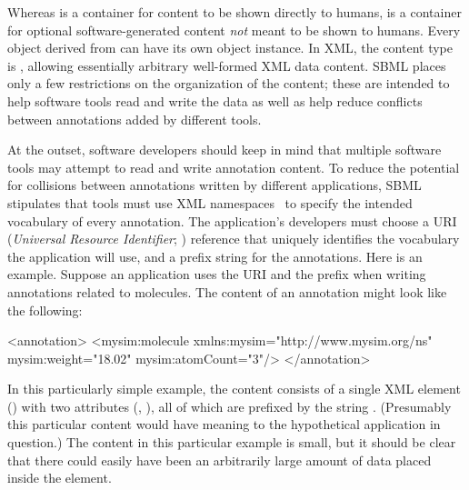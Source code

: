 \label{sec:annotation-use}
\label{sec:annotations}

Whereas \Notes is a container for content to be shown directly to
humans, \Annotation is a container for optional software-generated
content \emph{not} meant to be shown to humans.  Every object
derived from \SBase can have its own \Annotation object instance.
In XML, the \Annotation content type is , allowing
essentially arbitrary well-formed XML data content.  SBML places
only a few restrictions on the organization of the content; these
are intended to help software tools read and write the data as
well as help reduce conflicts between annotations added by
different tools.




At the outset, software developers should keep in mind that
multiple software tools may attempt to read and write annotation
content.  To reduce the potential for collisions between
annotations written by different applications, SBML \thisLV
stipulates that tools must use XML namespaces~\citep{bray:1999} to
specify the intended vocabulary of every annotation.  The
application's developers must choose a URI (\emph{Universal
  Resource Identifier}; \citealt{harold:2001,w3c:2000}) reference
that uniquely identifies the vocabulary the application will use,
and a prefix string for the annotations.  Here is an example.
Suppose an application uses the URI 
and the prefix  when writing annotations related to 
molecules.  The content of an annotation might look like the
following:

\begin{example}
<annotation>
    <mysim:molecule xmlns:mysim="http://www.mysim.org/ns"
         mysim:weight="18.02" mysim:atomCount="3"/>
</annotation>
\end{example}

In this particularly simple example, the content consists of a single
XML element () with two attributes
(, ), all of which are prefixed by
the string .  (Presumably this particular content
would have meaning to the hypothetical application in question.)
The content in this particular example is small, but it should be
clear that there could easily have been an arbitrarily large
amount of data placed inside the  element.

